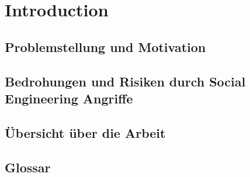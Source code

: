\chapter{Introduction}
\label{chapter:introduction}

\section{Problemstellung und Motivation}
\section{Bedrohungen und Risiken durch Social Engineering Angriffe}
\section{Übersicht über die Arbeit}
\section{Glossar}

\cite{latex}
